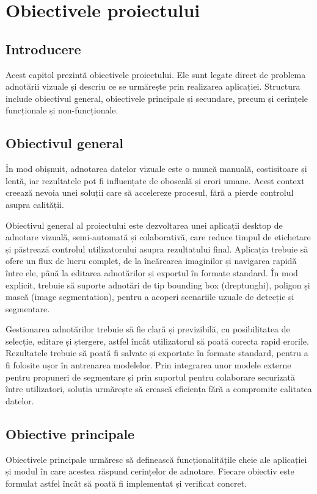 \chapter{Obiectivele proiectului}\label{ch:obiective}
\pagestyle{fancy}

\section{Introducere}
Acest capitol prezintă obiectivele proiectului. Ele sunt legate direct de problema adnotării vizuale și descriu ce se urmărește prin realizarea aplicației. Structura include obiectivul general, obiectivele principale și secundare, precum și cerințele funcționale și non-funcționale.

\section{Obiectivul general}
În mod obișnuit, adnotarea datelor vizuale este o muncă manuală, costisitoare și lentă, iar rezultatele pot fi influențate de oboseală și erori umane. Acest context creează nevoia unei soluții care să accelereze procesul, fără a pierde controlul asupra calității.

Obiectivul general al proiectului este dezvoltarea unei aplicații desktop de adnotare vizuală, semi-automată și colaborativă, care reduce timpul de etichetare și păstrează controlul utilizatorului asupra rezultatului final. Aplicația trebuie să ofere un flux de lucru complet, de la încărcarea imaginilor și navigarea rapidă între ele, până la editarea adnotărilor și exportul în formate standard. În mod explicit, trebuie să suporte adnotări de tip bounding box (dreptunghi), poligon și mască (image segmentation), pentru a acoperi scenariile uzuale de detecție și segmentare.

Gestionarea adnotărilor trebuie să fie clară și previzibilă, cu posibilitatea de selecție, editare și ștergere, astfel încât utilizatorul să poată corecta rapid erorile. Rezultatele trebuie să poată fi salvate și exportate în formate standard, pentru a fi folosite ușor în antrenarea modelelor. Prin integrarea unor modele externe pentru propuneri de segmentare și prin suportul pentru colaborare securizată între utilizatori, soluția urmărește să crească eficiența fără a compromite calitatea datelor.

\section{Obiective principale}
Obiectivele principale urmăresc să definească funcționalitățile cheie ale aplicației și modul în care acestea răspund cerințelor de adnotare. Fiecare obiectiv este formulat astfel încât să poată fi implementat și verificat concret.

